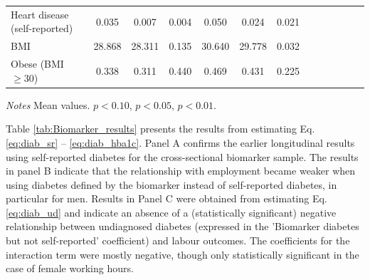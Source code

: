 \documentclass[12pt,english]{article}
\begin{document}
\begin{table}[!ht]
\begin{center}
\begin{adjustbox}{max width=\linewidth}
\begin{threeparttable}
{\begin{tabular}{l*{6}{S S}}
						Heart disease (self-reported)      &       0.035&       0.007&       0.004&       0.050&       0.024&       0.021\\
						BMI     &      28.868&      28.311&       0.135&      30.640&      29.778&       0.032\\
						Obese (BMI $\geq 30$)&       0.338&       0.311&       0.440&       0.469&       0.431&       0.225\\
						\bottomrule
					\end{tabular}
					\begin{tablenotes}
						\item \footnotesize \textit{Notes} Mean values. \sym{*} \(p<0.10\), \sym{**} \(p<0.05\), \sym{***} \(p<0.01\).
					\end{tablenotes}
				}
			\end{threeparttable}
		\end{adjustbox}
	\end{center}
\end{table}


Table \ref{tab:Biomarker_results} presents the results from estimating Eq. \ref{eq:diab_sr} -- \ref{eq:diab_hba1c}. Panel A confirms the earlier longitudinal results using self-reported diabetes for the cross-sectional biomarker sample. The results in panel B indicate that the relationship with employment became weaker when using diabetes defined by the biomarker instead of self-reported diabetes, in particular for men. Results in Panel C were obtained from estimating Eq. \ref{eq:diab_ud} and indicate an absence of a (statistically significant) negative relationship between undiagnosed diabetes (expressed in the 'Biomarker diabetes but not self-reported' coefficient) and labour outcomes. The coefficients for the interaction term were mostly negative, though only statistically significant in the case of female working hours. 
\end{document}
